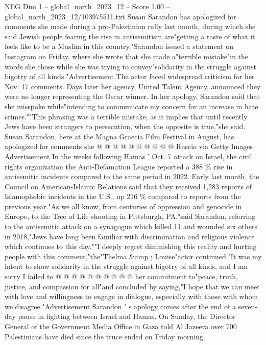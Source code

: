 \begin{textsample}{NEG Dim 1 – global\_north\_2023\_12 – Score 1.00 – global\_north\_2023\_12/103975511.txt}  \label{ex:f1_neg_366}
Susan Sarandon has apologized for comments she made during a pro-Palestinian rally last month, during which she said Jewish people fearing the rise in antisemitism are"getting a taste of what it feels like to be a Muslim in this country."Sarandon issued a statement on Instagram on Friday, where she wrote that she made a"terrible mistake"in the words she chose while she was trying to convey"solidarity in the struggle against bigotry of all kinds."Advertisement The actor faced widespread criticism for her Nov. 17 comments.
Days later her agency, United Talent Agency, announced they were no longer representing the Oscar winner.
In her apology, Sarandon said that she misspoke while"intending to communicate my concern for an increase in hate crimes.""This phrasing was a terrible mistake, as it implies that until recently Jews have been strangers to persecution, when the opposite is true,"she said.
Susan Sarandon, here at the Magna Graecia Film Festival in August, has apologized for comments she @ @ @ @ @ @ @ @ @ @ Ruscio via Getty Images Advertisement In the weeks following Hamas ' Oct. 7 attack on Israel, the civil rights organization the Anti-Defamation League reported a 388 \% rise in antisemitic incidents compared to the same period in 2022.
Early last month, the Council on American-Islamic Relations said that they received 1,283 reports of Islamophobic incidents in the U.S., up 216 \% compared to reports from the previous year."As we all know, from centuries of oppression and genocide in Europe, to the Tree of Life shooting in Pittsburgh, PA,"said Sarandon, referring to the antisemitic attack on a synagogue which killed 11 and wounded six others in 2018,"Jews have long been familiar with discrimination and religious violence which continues to this day.""I deeply regret diminishing this reality and hurting people with this comment,"the"Thelma \&amp ; Louise"actor continued."It was my intent to show solidarity in the struggle against bigotry of all kinds, and I am sorry I failed to @ @ @ @ @ @ @ @ @ @ her commitment to"peace, truth, justice, and compassion for all"and concluded by saying,"I hope that we can meet with love and willingness to engage in dialogue, especially with those with whom we disagree."Advertisement Sarandon ' s apology comes after the end of a seven-day pause in fighting between Israel and Hamas.
On Sunday, the Director General of the Government Media Office in Gaza told Al Jazeera over 700 Palestinians have died since the truce ended on Friday morning.

\end{textsample}

